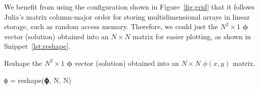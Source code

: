 We benefit from using the configuration shown in Figure~\ref{fig:grid} that it follows
Julia's matrix column-major order for storing multidimensional arrays in linear storage, such
as random access memory.
Therefore, we could just  the \(N^2 \times 1\) \(\bm{\phi}\) vector
(solution) obtained into an \(N \times N\) matrix for easier plotting,
as shown in Snippet~\ref{lst:reshape}.
%
\begin{algorithm}
    \caption{Reshape the \(N^2 \times 1\) \(\bm{\phi}\) vector
        (solution) obtained into an \(N \times N\) \(\phi(x, y)\) matrix.}
    \label{lst:reshape}
    \begin{juliacode}
ϕ = reshape(𝛟, N, N)
    \end{juliacode}
\end{algorithm}
